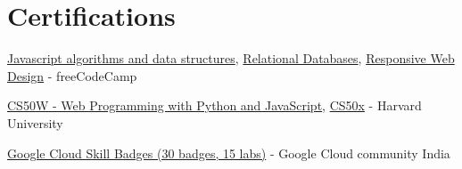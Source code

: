 \documentclass[a4paper,20pt]{article}
\newcommand{\resumeCertification}[3]{
  \item \small{
    \textbf{#1}{ - #2 \hfill #3 \vspace{-5pt}}
  }
}
\newcommand{\resumeSubHeadingListStart}{\begin{itemize}[label={}, leftmargin=*]}
\newcommand{\resumeSubHeadingListEnd}{\end{itemize}}
\begin{document}
\vspace{-5pt}

\section{Certifications}
\begin{description}[font=$ $]
    \item {\href{https://www.freecodecamp.org/certification/satyamrs00/javascript-algorithms-and-data-structures}{Javascript algorithms and data structures}, \href{https://www.freecodecamp.org/certification/satyamrs00/relational-database-v8}{Relational Databases}, \href{https://www.freecodecamp.org/certification/satyamrs00/responsive-web-design}{Responsive Web Design} - freeCodeCamp} 
    \vspace{-5pt}
    \item {\href{https://cs50.harvard.edu/certificates/0012af60-69d4-4f28-8829-5c4eac4cae39}{CS50W - Web Programming with Python and JavaScript}, \href{https://certificates.cs50.io/5a9d3a4b-57f0-4d46-95fa-222159e1368f.pdf?size=letter}{CS50x} - Harvard University}
    \vspace{-5pt}
    \item {\href{https://www.cloudskillsboost.google/public_profiles/979efb3e-91bc-476f-ba38-d35c4879a1fa}{Google Cloud Skill Badges (30 badges, 15 labs)} - Google Cloud community India}
    \vspace{-5pt}
\end{description}
\end{document}
